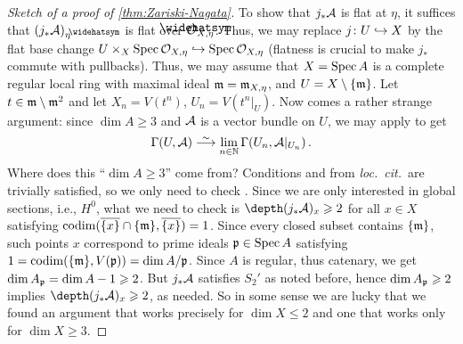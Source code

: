 \begin{proof}[Sketch of a proof of \cref{thm:Zariski-Nagata}]
	To show that $j_*\mathcal{A}$ is flat at $\eta$, it suffices that $(j_*\Aa)_\eta^\complete$ is flat over $\roof{\Oo}_{X,\eta}$. Thus, we may replace $j\colon U\monomorphism X$ by the flat base change
	$U\times_X\Spec \Oo_{X,\eta}\monomorphism \Spec \Oo_{X,\eta}$
	(flatness is crucial to make $j_*$ commute with pullbacks). Thus, we may assume that $X=\operatorname{Spec} A$ is a complete regular local ring with maximal ideal $\mathfrak{m}=\mathfrak{m}_{X,\eta}$, and $U=X\setminus \{\mathfrak{m}\}$. Let $t\in\mathfrak{m}\setminus \mathfrak{m}^2$ and let $X_n=V(t^n)$, $U_n=V(t^n|_U)$. Now comes a rather strange argument: since $\dim A\geq 3$ and $\mathcal{A}$ is a vector bundle on $U$, we may apply \cite[Exposé~IX Proposition~1.4]{sga2} to get 
	\begin{equation}\label{eq:FF}
		\Global(U,\Aa)\isomorphism\limit_{n\in\IN}\Global(U_n,\Aa|_{U_n})\,.
	\end{equation}
	Where does this \enquote{$\dim A\geq 3$} come from? Conditions  and  from \emph{loc.\ cit.}\ are trivially satisfied, so we only need to check . Since we are only interested in global sections, i.e., $H^0$, what we need to check is $\depth (j_*\Aa)_x\geq 2$ for all $x\in X$ satisfying $\codim (\ov{\{x\}}\cap \{\mm\},\ov{\{x\}})=1$. Since every closed subset contains $\{\mathfrak{m}\}$, such points $x$ correspond to prime ideals $\mathfrak{p}\in \operatorname{Spec} A$ satisfying $1=\operatorname{codim}(\{\mathfrak{m}\},V(\mathfrak{p}))=\dim A/\mathfrak{p}$. Since $A$ is regular, thus catenary, we get $\dim A_{\mathfrak{p}}=\dim A-1\geqslant 2$. But $j_*\mathcal{A}$ satisfies $S_2'$ as noted before, hence $\dim A_{\mathfrak{p}}\geqslant 2$ implies $\depth (j_*\Aa)_x\geq 2$, as needed. So in some sense we are lucky that we found an argument that works precisely for $\dim X\leq 2$ and one that works only for $\dim X\geq 3$.
	

\end{proof}
